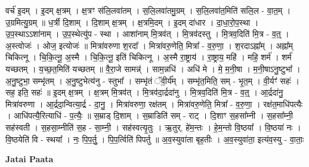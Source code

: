 \documentclass[17pt]{extarticle}
\begin{document}
वर्च॑ इ॒दम् । इ॒दम् क्ष॒त्रम् । क्ष॒त्रꣳ स॑लि॒लवा॑तम् । स॒लि॒लवा॑तमु॒ग्रम् । स॒लि॒लवा॑त॒मिति॑ सलि॒ल - वा॒त॒म् । उ॒ग्रमित्यु॒ग्रम् ॥ ध॒र्त्री दि॒शाम् । दि॒शाम् क्ष॒त्रम् । क्ष॒त्रमि॒दम् । इ॒दम् दा॑धार । दा॒धा॒रो॒प॒स्था । उ॒प॒स्थाऽऽशा॑नाम् । उ॒प॒स्थेत्यु॑प - स्था । आशा॑नाम् मि॒त्रव॑त् । मि॒त्रव॑दस्तु । मि॒त्रव॒दिति॑ मि॒त्र - व॒त्॒ । अ॒स्त्वोजः॑ । ओज॒ इत्योजः॑ ॥ मित्रा॑वरुणा श॒रदा᳚ । मित्रा॑वरु॒णेति॒ मित्रा᳚ - व॒रु॒णा॒ । श॒रदाऽह्ना᳚म् । अह्ना᳚म् चिकित्नू । चि॒कि॒त्नू॒ अ॒स्मै । चि॒कि॒त्नू॒ इति॑ चिकित्नू । अ॒स्मै रा॒ष्ट्राय॑ । रा॒ष्ट्राय॒ महि॑ । महि॒ शर्म॑ । शर्म॑ यच्छतम् । य॒च्छ॒त॒मिति॑ यच्छतम् ॥ वै॒रा॒जे सामन्न्॑ । साम॒न्नधि॑ । अधि॑ मे । मे॒ म॒नी॒षा । म॒नी॒षाऽनु॒ष्टुभा᳚ । अ॒नु॒ष्टुभा॒ सम्भृ॑तम् । अ॒नु॒ष्टुभेत्य॑नु - स्तुभा᳚ । सम्भृ॑तं ॅवी॒र्य᳚म् । सम्भृ॑त॒मिति॒ सम् - भृ॒त॒म् । वी॒र्यꣳ॑ सहः॑ । सह॒ इति॒ सहः॑ ॥ इ॒दम् क्ष॒त्रम् । क्ष॒त्रम् मि॒त्रव॑त् । मि॒त्रव॑दा॒र्द्रदा॑नु । मि॒त्रव॒दिति॑ मि॒त्र - व॒त्॒ । आ॒र्द्रदा॑नु॒ मित्रा॑वरुणा । आ॒र्द्रदा॒न्वित्या॒र्द्र - दा॒नु॒ । मित्रा॑वरुणा॒ रक्ष॑तम् । मित्रा॑वरु॒णेति॒ मित्रा᳚ - व॒रु॒णा॒ । रक्ष॑त॒माधि॑पत्यैः । आधि॑पत्यै॒रित्याधि॑ - प॒त्यैः॒ ॥ स॒म्राड् दि॒शाम् । स॒म्राडिति॑ सम् - राट् । दि॒शाꣳ स॒हसा᳚म्नी । स॒हसा᳚म्नी॒ सह॑स्वती । स॒हसा॒म्नीति॑ स॒ह - सा॒म्नी॒ । सह॑स्वत्यृ॒तुः । ऋ॒तुर्. हे॑म॒न्तः । हे॒म॒न्तो वि॒ष्ठया᳚ । वि॒ष्ठया॑ नः । वि॒ष्ठयेति॑ वि - स्थया᳚ । नः॒ पि॒प॒र्तु॒ । पि॒प॒र्त्विति॑ पिपर्तु ॥ अ॒व॒स्युवा॑ता बृह॒तीः । अ॒व॒स्युवा॑ता॒ इत्य॑व॒स्यु - वा॒ताः॒ \newline

\textbf{Jatai Paata} \newline
\end{document}
